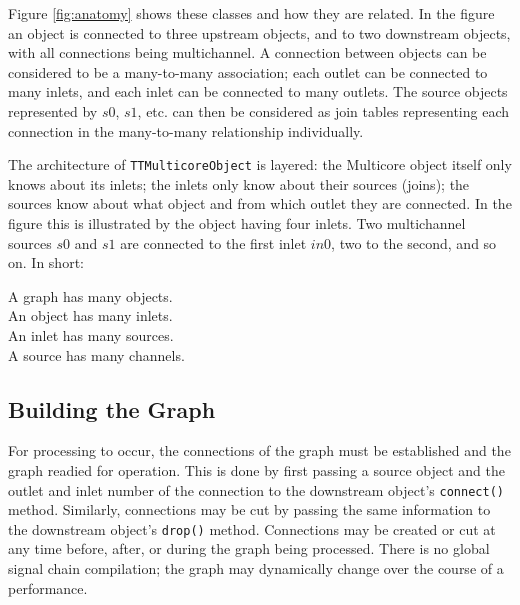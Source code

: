 \documentclass[twoside,a4paper]{article}
\begin{document}
Figure \ref{fig:anatomy} shows these classes and how they are related. In the figure an object is connected to three upstream objects, and to two downstream objects, with all connections being multichannel.  A connection between objects can be considered to be a many-to-many association; each outlet can be connected to many inlets, and each inlet can be connected to many outlets. The source objects represented by $s0$, $s1$, etc. can then be considered as join tables representing each connection in the many-to-many relationship individually.

The architecture of \texttt{TTMulticoreObject} is layered: the Multicore object itself only knows about its inlets; the inlets only know about their sources (joins); the sources know about what object and from which outlet they are connected. In the figure this is illustrated by the object having four inlets. Two multichannel sources $s0$ and $s1$ are connected to the first inlet $in0$, two to the second, and so on. In short:

				A graph has many objects.\\
\indent	An object has many inlets.\\
\indent	An inlet has many sources.\\
\indent	A source has many channels.\\




\subsection{Building the Graph} %

For processing to occur, the connections of the graph must be established and the graph readied for operation.  This is done by first passing a source object and the outlet and inlet number of the connection to the downstream object's \texttt{connect()} method.  Similarly, connections may be cut by passing the same information to the downstream object's \texttt{drop()} method.  Connections may be created or cut at any time before, after, or during the graph being processed.  There is no global signal chain compilation; the graph may dynamically change over the course of a performance.
\end{document}
